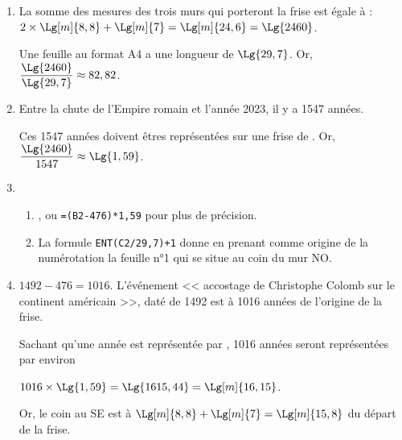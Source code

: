 \begin{enumerate}
    \item La somme des mesures des trois murs qui porteront la frise est égale à : $2\times\Lg[m]{8,8}+\Lg[m]{7} =\Lg[m]{24,6} =\Lg{2460}$. \par
       Une feuille au format A4 a une longueur de $\Lg{29,7}$. Or, $\dfrac{\Lg{2460}}{\Lg{29,7}} \approx82,82$. \par
    \item Entre la chute de l'Empire romain et l'année 2023, il y a 1547 années. \par
       Ces 1547 années doivent êtres représentées sur une frise de . Or, $\dfrac{\Lg{2460}}{1547} \approx\Lg{1,59}$. \par
    \item
       \begin{enumerate}
          \item {}, ou \texttt{=(B2-476)*1,59} pour plus de précision.
          \item La formule \texttt{ENT(C2/29,7)+1} donne  en prenant comme origine de la numérotation la feuille n°1 qui se situe au coin du mur NO.  
       \end{enumerate}
    \item $1492-476 =1016$. L'événement << accostage de Christophe Colomb sur le continent américain >>, daté de 1492 est à 1016 années de l'origine de la frise. \par
       Sachant qu'une année est représentée par , 1016 années seront représentées par environ \par
       $1016\times\Lg{1,59} =\Lg{1615,44} =\Lg[m]{16,15}$. \par
       Or, le coin au SE est à $\Lg[m]{8,8}+\Lg[m]{7} =\Lg[m]{15,8}$ du départ de la frise. \par
 \end{enumerate}